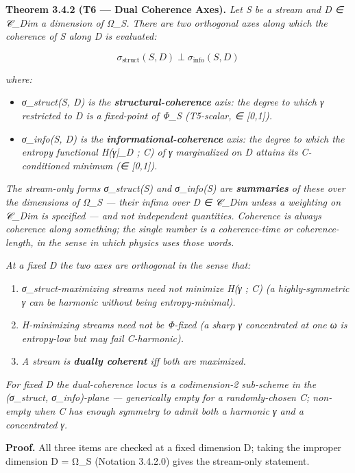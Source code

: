 \documentclass[11pt, openany]{book}
\begin{document}
\textbf{Theorem 3.4.2 (T6 --- Dual Coherence Axes).} \textit{Let S be a stream and D ∈ 𝒞\_\allowbreak{}Dim a dimension of Ω\_\allowbreak{}S. There are two orthogonal axes along which the coherence of S along D is evaluated:}

\[
\sigma_\mathrm{struct}(S, D) \perp \sigma_\mathrm{info}(S, D)
\]

\textit{where:}
\begin{itemize}
\item \textit{σ\_\allowbreak{}struct(S, D) is the \textbf{structural-coherence} axis: the degree to which γ restricted to D is a fixed-point of Φ\_\allowbreak{}S (T5-scalar, ∈ [0,1]).}
\item \textit{σ\_\allowbreak{}info(S, D) is the \textbf{informational-coherence} axis: the degree to which the entropy functional H(γ|\_\allowbreak{}D ; C) of γ marginalized on D attains its C-conditioned minimum (∈ [0,1]).}
\end{itemize}

\textit{The stream-only forms σ\_\allowbreak{}struct(S) and σ\_\allowbreak{}info(S) are \textbf{summaries} of these over the dimensions of Ω\_\allowbreak{}S --- their infima over D ∈ 𝒞\_\allowbreak{}Dim unless a weighting on 𝒞\_\allowbreak{}Dim is specified --- and not independent quantities. Coherence is always coherence along something; the single number is a coherence-time or coherence-length, in the sense in which physics uses those words.}

\textit{At a fixed D the two axes are orthogonal in the sense that:}

\begin{enumerate}
\item \textit{σ\_\allowbreak{}struct-maximizing streams need not minimize H(γ ; C) (a highly-symmetric γ can be harmonic without being entropy-minimal).}
\item \textit{H-minimizing streams need not be Φ-fixed (a sharp γ concentrated at one ω is entropy-low but may fail C-harmonic).}
\item \textit{A stream is \textbf{dually coherent} iff both are maximized.}
\end{enumerate}

\textit{For fixed D the dual-coherence locus is a codimension-2 sub-scheme in the (σ\_\allowbreak{}struct, σ\_\allowbreak{}info)-plane --- generically empty for a randomly-chosen C; non-empty when C has enough symmetry to admit both a harmonic γ and a concentrated γ.}

\textbf{Proof.} All three items are checked at a fixed dimension D; taking the improper dimension D = Ω\_\allowbreak{}S (Notation 3.4.2.0) gives the stream-only statement.
\end{document}
